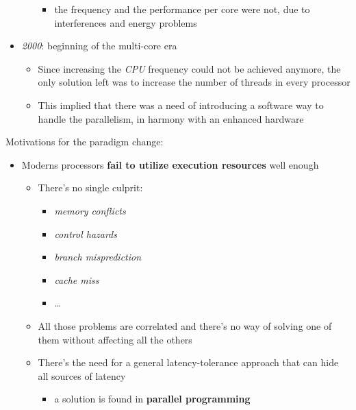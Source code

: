 \documentclass[english]{article}
\begin{document}
\begin{itemize}
\begin{itemize}
\begin{itemize}
                  \item the frequency and the performance per core were not, due to interferences and energy problems
                \end{itemize}
        \end{itemize}
  \item \textit{2000}: beginning of the multi-core era
        \begin{itemize}
          \item Since increasing the \textit{CPU} frequency could not be achieved anymore, the only solution left was to increase the number of threads in every processor
          \item This implied that there was a need of introducing a software way to handle the parallelism, in harmony with an enhanced hardware
        \end{itemize}
\end{itemize}

\bigskip
Motivations for the paradigm change:

\begin{itemize}
  \item Moderns processors \textbf{fail to utilize execution resources} well enough
        \begin{itemize}
          \item There's no single culprit:
                \begin{itemize}[label=\xmarkthin]
                  \item \textit{memory conflicts}
                  \item \textit{control hazards}
                  \item \textit{branch misprediction}
                  \item \textit{cache miss}
                  \item \ldots
                \end{itemize}
          \item All those problems are correlated and there's no way of solving one of them without affecting all the others
          \item There's the need for a general latency-tolerance approach that can hide all sources of latency
                \begin{itemize}[label=\cmarkthin]
                  \item a solution is found in \textbf{parallel programming}
                \end{itemize}
        \end{itemize}
\end{itemize}
\end{document}
